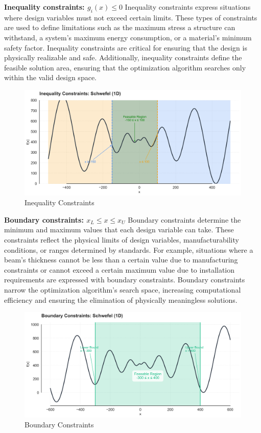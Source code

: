 \textbf{Inequality constraints: $g_i(x) \leq 0$}
Inequality constraints express situations where design variables must not exceed certain limits. These types of constraints are used to define limitations such as the maximum stress a structure can withstand, a system's maximum energy consumption, or a material's minimum safety factor. Inequality constraints are critical for ensuring that the design is physically realizable and safe. Additionally, inequality constraints define the feasible solution area, ensuring that the optimization algorithm searches only within the valid design space.

\begin{figure}[H]
    \centering
    \includegraphics[width=1\textwidth]{weeks_new/imgs/inequality_constraints.png}
    \caption{Inequality Constraints}
    \label{fig:}
\end{figure}

\textbf{Boundary constraints: $x_L \leq x \leq x_U$}
Boundary constraints determine the minimum and maximum values that each design variable can take. These constraints reflect the physical limits of design variables, manufacturability conditions, or ranges determined by standards. For example, situations where a beam's thickness cannot be less than a certain value due to manufacturing constraints or cannot exceed a certain maximum value due to installation requirements are expressed with boundary constraints. Boundary constraints narrow the optimization algorithm's search space, increasing computational efficiency and ensuring the elimination of physically meaningless solutions.

\begin{figure}[H]
    \centering
    \includegraphics[width=1\textwidth]{weeks_new/imgs/boundary_constraints.png}
    \caption{Boundary Constraints}
    \label{fig:}
\end{figure}

